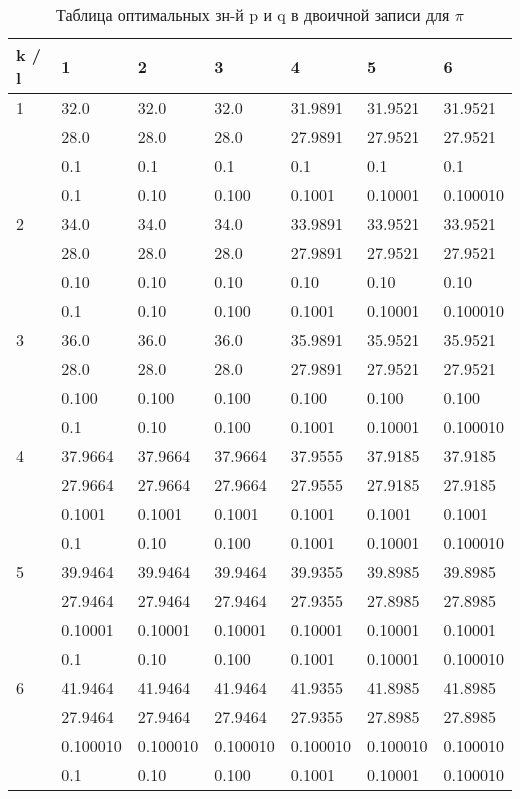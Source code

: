 \documentclass[12pt]{article}
\begin{document}
	
\begin{table}[h]
	\caption{Таблица оптимальных зн-й p и q в двоичной записи для $\pi$}
	\label{table:piBinary}
	\begin{center}
		\begin{tabular}{|l|l|l|l|l|l|l|}
			\hline
			k / l &1 & 2 & 3 & 4 & 5 & 6\\
			\hline
			1 & 32.0& 32.0& 32.0& 31.9891& 31.9521& 31.9521\\
			& 28.0& 28.0& 28.0& 27.9891& 27.9521& 27.9521\\
			& 0.1& 0.1& 0.1& 0.1& 0.1& 0.1\\
			& 0.1& 0.10& 0.100& 0.1001& 0.10001& 0.100010\\
			\hline
			2 & 34.0& 34.0& 34.0& 33.9891& 33.9521& 33.9521\\
			& 28.0& 28.0& 28.0& 27.9891& 27.9521& 27.9521\\
			& 0.10& 0.10& 0.10& 0.10& 0.10& 0.10\\
			& 0.1& 0.10& 0.100& 0.1001& 0.10001& 0.100010\\
			\hline
			3 & 36.0& 36.0& 36.0& 35.9891& 35.9521& 35.9521\\
			& 28.0& 28.0& 28.0& 27.9891& 27.9521& 27.9521\\
			& 0.100& 0.100& 0.100& 0.100& 0.100& 0.100\\
			& 0.1& 0.10& 0.100& 0.1001& 0.10001& 0.100010\\
			\hline
			4 & 37.9664& 37.9664& 37.9664& 37.9555& 37.9185& 37.9185\\
			& 27.9664& 27.9664& 27.9664& 27.9555& 27.9185& 27.9185\\
			& 0.1001& 0.1001& 0.1001& 0.1001& 0.1001& 0.1001\\
			& 0.1& 0.10& 0.100& 0.1001& 0.10001& 0.100010\\
			\hline
			5 & 39.9464& 39.9464& 39.9464& 39.9355& 39.8985& 39.8985\\
			& 27.9464& 27.9464& 27.9464& 27.9355& 27.8985& 27.8985\\
			& 0.10001& 0.10001& 0.10001& 0.10001& 0.10001& 0.10001\\
			& 0.1& 0.10& 0.100& 0.1001& 0.10001& 0.100010\\
			\hline
			6 & 41.9464& 41.9464& 41.9464& 41.9355& 41.8985& 41.8985\\
			& 27.9464& 27.9464& 27.9464& 27.9355& 27.8985& 27.8985\\
			& 0.100010& 0.100010& 0.100010& 0.100010& 0.100010& 0.100010\\
			& 0.1& 0.10& 0.100& 0.1001& 0.10001& 0.100010\\
			\hline
		\end{tabular}
	\end{center}
\end{table}
	
\end{document}
